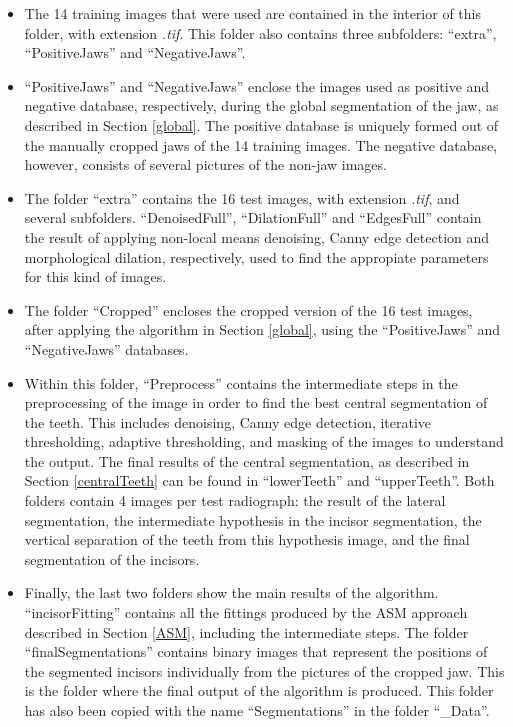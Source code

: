 \documentclass[a4paper,11pt,twoside]{article}
\begin{document}
\begin{itemize}
\item The 14 training images that were used are contained in the interior of this folder, with extension \textit{.tif}. This folder also contains three subfolders: ``extra'', ``PositiveJaws'' and ``NegativeJaws''.
\item ``PositiveJaws'' and ``NegativeJaws'' enclose the images used as positive and negative database, respectively, during the global segmentation of the jaw, as described in Section \textsection\ref{global}. The positive database is uniquely formed out of the manually cropped jaws of the 14 training images. The negative database, however, consists of several pictures of the non-jaw images.
\item The folder ``extra'' contains the 16 test images, with extension \textit{.tif}, and several subfolders. ``DenoisedFull'', ``DilationFull'' and ``EdgesFull'' contain the result of applying non-local means denoising, Canny edge detection and morphological dilation, respectively, used to find the appropiate parameters for this kind of images. 
\item The folder ``Cropped'' encloses the cropped version of the 16 test images, after applying the algorithm in Section \textsection\ref{global}, using the ``PositiveJaws'' and ``NegativeJaws'' databases. 
\item Within this folder, ``Preprocess'' contains the intermediate steps in the preprocessing of the image in order to find the best central segmentation of the teeth. This includes denoising, Canny edge detection, iterative thresholding, adaptive thresholding, and masking of the images to understand the output. The final results of the central segmentation, as described in Section \textsection\ref{centralTeeth} can be found in ``lowerTeeth'' and ``upperTeeth''. Both folders contain 4 images per test radiograph: the result of the lateral segmentation, the intermediate hypothesis in the incisor segmentation, the vertical separation of the teeth from this hypothesis image, and the final segmentation of the incisors.
\item Finally, the last two folders show the main results of the algorithm. ``incisorFitting'' contains all the fittings produced by the ASM approach described in Section \textsection\ref{ASM}, including the intermediate steps. The folder ``finalSegmentations'' contains binary images that represent the positions of the segmented incisors individually from the pictures of the cropped jaw. This is the folder where the final output of the algorithm is produced. This folder has also been copied with the name ``Segmentations'' in the folder ``\_Data''.
\end{itemize}
\end{document}

